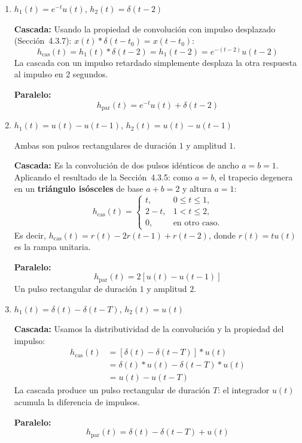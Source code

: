 \documentclass[10pt,a4paper]{article}
\begin{document}
	\begin{enumerate}[label=\textbf{\alph*)}]
		\item $h_1(t) = e^{-t}u(t)$, $h_2(t) = \delta(t-2)$
		
		\textbf{Cascada:} Usando la propiedad de convolución con impulso desplazado (Sección~4.3.7): $x(t)*\delta(t-t_0) = x(t-t_0)$:
		\[
		h_{\text{cas}}(t) = h_1(t) * \delta(t-2) = h_1(t-2) = e^{-(t-2)}u(t-2)
		\]
		La cascada con un impulso retardado simplemente desplaza la otra respuesta al impulso en 2 segundos.
		
		\textbf{Paralelo:}
		\[
		h_{\text{par}}(t) = e^{-t}u(t) + \delta(t-2)
		\]
		
		\item $h_1(t) = u(t) - u(t-1)$, $h_2(t) = u(t) - u(t-1)$
		
		Ambas son pulsos rectangulares de duración $1$ y amplitud $1$.
		
		\textbf{Cascada:} Es la convolución de dos pulsos idénticos de ancho $a = b = 1$. Aplicando el resultado de la Sección~4.3.5: como $a = b$, el trapecio degenera en un \textbf{triángulo isósceles} de base $a+b = 2$ y altura $a = 1$:
		\[
		h_{\text{cas}}(t) = \begin{cases}
		t, & 0 \leq t \leq 1, \\
		2-t, & 1 < t \leq 2, \\
		0, & \text{en otro caso.}
		\end{cases}
		\]
		Es decir, $h_{\text{cas}}(t) = r(t) - 2r(t-1) + r(t-2)$, donde $r(t) = tu(t)$ es la rampa unitaria.
		
		\textbf{Paralelo:}
		\[
		h_{\text{par}}(t) = 2[u(t) - u(t-1)]
		\]
		Un pulso rectangular de duración $1$ y amplitud $2$.
		
		\item $h_1(t) = \delta(t) - \delta(t-T)$, $h_2(t) = u(t)$
		
		\textbf{Cascada:} Usamos la distributividad de la convolución y la propiedad del impulso:
		\begin{align*}
		h_{\text{cas}}(t) &= [\delta(t) - \delta(t-T)] * u(t) \\
		&= \delta(t) * u(t) - \delta(t-T) * u(t) \\
		&= u(t) - u(t-T)
		\end{align*}
		La cascada produce un pulso rectangular de duración $T$: el integrador $u(t)$ acumula la diferencia de impulsos.
		
		\textbf{Paralelo:}
		\[
		h_{\text{par}}(t) = \delta(t) - \delta(t-T) + u(t)
		\]
	\end{enumerate}
\end{document}
